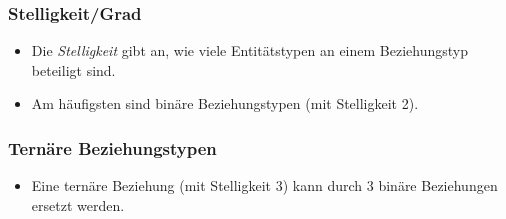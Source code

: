 \documentclass[a4paper, 11pt, accentcolor = tud3b]{tudreport}
\begin{document}
                \subsubsection{Stelligkeit/Grad} %
                    \begin{itemize}
                    	\item Die \textit{Stelligkeit} gibt an, wie viele Entitätstypen an einem Beziehungstyp beteiligt sind.
                    	\item Am häufigsten sind binäre Beziehungstypen (mit Stelligkeit 2).
                    \end{itemize}

                \subsubsection{Ternäre Beziehungstypen} %
                    \begin{itemize}
                    	\item Eine ternäre Beziehung (mit Stelligkeit 3) kann durch 3 binäre Beziehungen ersetzt werden.
                    \end{itemize}
                
\end{document}
